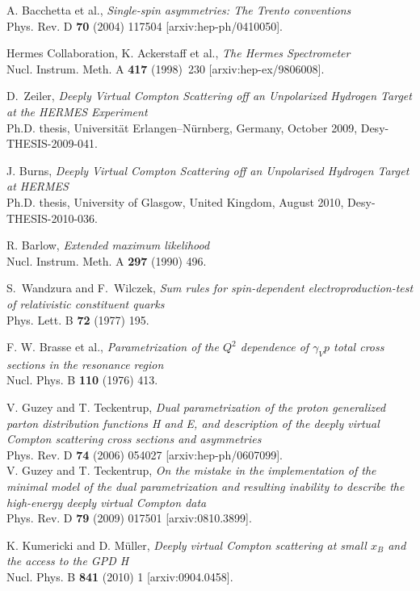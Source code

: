 \documentclass[11pt,a4paper]{article}
\begin{document}
\begin{thebibliography}{10}
A. Bacchetta et al., \emph{Single-spin asymmetries: The Trento conventions}
\\Phys. Rev. D \textbf{70} (2004) 117504 [arxiv:hep-ph/0410050].

H{\sc ermes} Collaboration, K. Ackerstaff et al., \emph{The H{\sc ermes} Spectrometer}
\\Nucl. Instrum. Meth. A {\bf 417} (1998)~230 [arxiv:hep-ex/9806008].

D.~Zeiler, \emph{Deeply Virtual Compton Scattering off an Unpolarized Hydrogen Target at the HERMES Experiment}
\\Ph.D. thesis, Universit\"at Erlangen--N\"urnberg, Germany, October 2009, D{\sc esy}-THESIS-2009-041.

J. Burns, \emph{Deeply Virtual Compton Scattering off an Unpolarised Hydrogen Target at HERMES}
\\Ph.D. thesis, University of Glasgow, United Kingdom, August 2010, D{\sc esy}-THESIS-2010-036.

R. Barlow, \emph{Extended maximum likelihood}
\\Nucl. Instrum. Meth. A {\bf 297} (1990) 496.

S.~Wandzura and F.~Wilczek, \emph{Sum rules for spin-dependent electroproduction-test of relativistic constituent quarks}
\\Phys. Lett. B \textbf{72} (1977) 195.

F. W. Brasse et al., \emph{Parametrization of the $Q^2$ dependence of $\gamma_V p$ total cross sections in the resonance region}
\\Nucl. Phys. B {\bf 110} (1976) 413.

V. Guzey and T. Teckentrup, \emph{Dual parametrization of the proton generalized parton distribution functions H and E, and description of the deeply virtual Compton scattering cross sections and asymmetries}
\\Phys. Rev. D {\bf 74} (2006) 054027 [arxiv:hep-ph/0607099].\\

V. Guzey and T. Teckentrup, \emph{On the mistake in the implementation of the minimal model of the dual parametrization and resulting inability to describe the high-energy deeply virtual Compton data}
\\Phys. Rev. D {\bf 79} (2009) 017501 [arxiv:0810.3899].

K. Kumericki and D. M\"uller, \emph{Deeply virtual Compton scattering at small $x_B$ and the access to the GPD H}
\\Nucl. Phys. B {\bf 841} (2010) 1 [arxiv:0904.0458].


\end{thebibliography}
\end{document}
